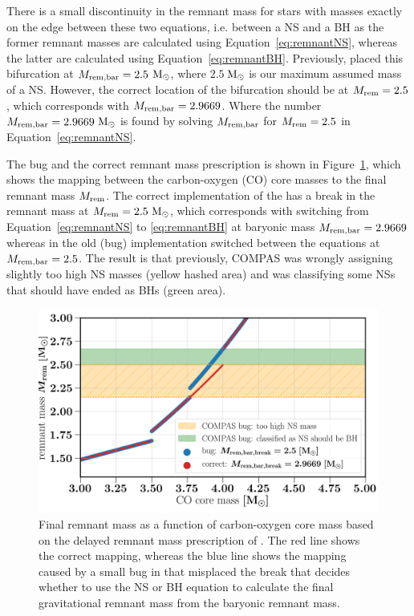 \documentclass[twocolumn]{aastex63}
\newcommand{\Msun}{\ensuremath{\,\rm{M}_{\odot}}\xspace}
\begin{document}
There is a small discontinuity in the remnant mass  for stars with masses exactly on the edge between these two equations, i.e.  between a \ac{NS} and a \ac{BH} as the former remnant masses are calculated using Equation~\ref{eq:remnantNS}, whereas the latter are calculated using Equation~\ref{eq:remnantBH}.  
Previously, {} placed this bifurcation at $M_{\rm{rem,bar}} = 2.5$\Msun, where $2.5$\Msun is our maximum assumed mass of a NS. However, the correct location of the bifurcation should be  at $M_{\rm{rem}} = 2.5$, which corresponds with $M_{\rm{rem,bar}} = 2.9669$. Where the number $M_{\rm{rem,bar}} = 2.9669$\Msun is found by solving $M_{\rm{rem,bar}}$ for $M_{\rm{rem}} = 2.5$ in Equation~\ref{eq:remnantNS}.

The bug and the correct remnant mass prescription is shown in Figure~\ref{fig:app-fryer2012-bug-fix}, which shows the mapping between the carbon-oxygen (CO) core masses to the final remnant mass $M_{\rm{rem}} $.  The  correct implementation of  the \citep{2012ApJ...749...91F} has a break in the remnant mass at $M_{\rm{rem}} =2.5$\Msun, which corresponds with switching from Equation~\ref{eq:remnantNS} to \ref{eq:remnantBH} at baryonic mass $M_{\rm{rem,bar}} =2.9669$ whereas in the old (bug) implementation {} switched between the equations at $M_{\rm{rem,bar}} =2.5$. The result is that previously, COMPAS was wrongly assigning slightly too high \ac{NS} masses (yellow hashed area) and was classifying some NSs that should have ended as \ac{BH}s (green area). 

%
\begin{figure}
\includegraphics[width=.5\columnwidth]{../fryer2012remnantBUG/remnantMassMnsmaxVariatios.png}
   \caption{Final remnant mass as a function of carbon-oxygen core mass based on the delayed remnant mass prescription of   \citet{2012ApJ...749...91F}. The red line shows the correct mapping, whereas the blue line shows the mapping caused by a small bug in {} that misplaced the break that decides whether to use the \ac{NS} or \ac{BH} equation to calculate the final gravitational remnant mass from the baryonic remnant mass.    }
%
  \label{fig:app-fryer2012-bug-fix}
\end{figure}
%
\end{document}
